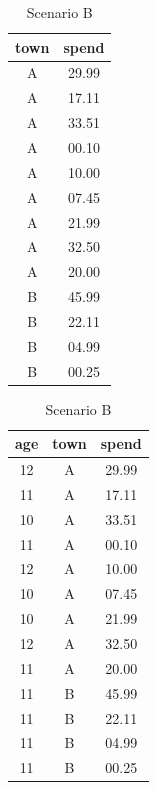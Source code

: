\documentclass[a4paper, 11pt]{article}
\begin{document}
\begin{table}[hbtp]
    \centering
    \begin{minipage}{0.2\textwidth}
    \centering
    \begin{tabular}{c|c}
        town & spend \\
        \hline
        A    & 29.99 \\
        A    & 17.11 \\
        A    & 33.51 \\
        A    & 00.10 \\
        A    & 10.00 \\
        A    & 07.45 \\
        A    & 21.99 \\
        A    & 32.50 \\
        A    & 20.00 \\
        B    & 45.99 \\
        B    & 22.11 \\
        B    & 04.99 \\
        B    & 00.25 \\
    \end{tabular}
    \caption{Scenario A}
    \end{minipage}
    \begin{minipage}{0.3\textwidth}
    \centering
    \begin{tabular}{cc|c}
         age & town & spend \\
        \hline
        12  & A    & 29.99 \\
        11  & A    & 17.11 \\
        10  & A    & 33.51 \\
        11  & A    & 00.10 \\
        12  & A    & 10.00 \\
        10  & A    & 07.45 \\
        10  & A    & 21.99 \\
        12  & A    & 32.50 \\
        11  & A    & 20.00 \\
        11  & B    & 45.99 \\
        11  & B    & 22.11 \\
        11  & B    & 04.99 \\
        11  & B    & 00.25 \\
    \end{tabular}
     \caption{Scenario B}
    \end{minipage}

\end{table}
\end{document}
